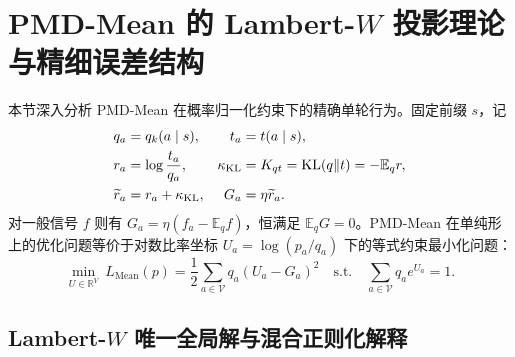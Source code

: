 \documentclass[lang=cn,scheme=chinese,openany]{elegantbook}
\newcommand{\E}{\mathbb E}
\newcommand{\KL}{\operatorname{KL}}
\newcommand{\R}{\mathbb R}
\begin{document}
\section{PMD-Mean 的 Lambert-\texorpdfstring{$W$}{W} 投影理论与精细误差结构}
\label{dyn:mean-static}

本节深入分析 PMD-Mean 在概率归一化约束下的精确单轮行为。固定前缀 $s$，记
\begin{align}
 q_a&=q_k(a\mid s), & t_a&=t(a\mid s),\notag\\
 r_a&=\log\frac{t_a}{q_a}, &
 \kappa_{\mathrm{KL}}&=K_{qt}=\KL(q\Vert t)=-\E_q r,\notag\\
 \widetilde r_a&=r_a+\kappa_{\mathrm{KL}}, & G_a&=\eta \widetilde r_a.
 \label{dyn:eq:mean-local-opd-definitions}
\end{align}
对一般信号 $f$ 则有 $G_a=\eta(f_a-\E_q f)$，恒满足 $\E_q G=0$。PMD-Mean 在单纯形上的优化问题等价于对数比率坐标 $U_a=\log(p_a/q_a)$ 下的等式约束最小化问题：
\begin{equation}
\label{eq:ch2-mean-loss,dyn:eq:mean-opd-local-problem}
\min_{U\in\R^V}\ L_{\mathrm{Mean}}(p)=\frac12\sum_{a\in\mathcal V} q_a(U_a-G_a)^2
\quad\text{s.t.}\quad
\sum_{a\in\mathcal V} q_a e^{U_a}=1.
\end{equation}

\subsection{Lambert-\texorpdfstring{$W$}{W} 唯一全局解与混合正则化解释}
\end{document}
